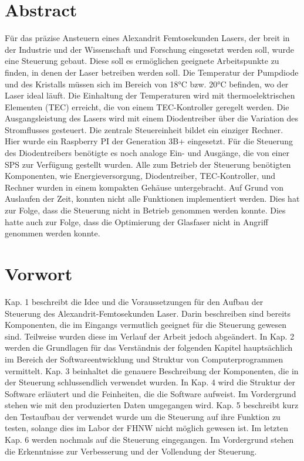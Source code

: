\section*{Abstract}
Für das präzise Ansteuern eines Alexandrit Femtosekunden Lasers, der breit in der Industrie und der Wissenschaft und Forschung eingesetzt werden soll, wurde eine Steuerung gebaut. Diese soll es ermöglichen geeignete Arbeitspunkte zu finden, in denen der Laser betreiben werden soll. Die Temperatur der Pumpdiode und des Kristalls müssen sich im Bereich von 18°C bzw. 20°C befinden, wo der Laser ideal läuft. Die Einhaltung der Temperaturen wird mit thermoelektrischen Elementen (TEC) erreicht, die von einem TEC-Kontroller geregelt werden. Die Ausgangsleistung des Lasers wird mit einem Diodentreiber über die Variation des Stromflusses gesteuert. Die zentrale Steuereinheit bildet ein einziger Rechner. Hier wurde ein Raspberry PI der Generation 3B+ eingesetzt. Für die Steuerung des Diodentreibers benötigte es noch analoge Ein- und Ausgänge, die von einer SPS zur Verfügung gestellt wurden. Alle zum Betrieb der Steuerung benötigten Komponenten, wie Energieversorgung, Diodentreiber, TEC-Kontroller, und Rechner wurden in einem kompakten Gehäuse untergebracht. Auf Grund von Auslaufen der Zeit, konnten nicht alle Funktionen implementiert werden. Dies hat zur Folge, dass die Steuerung nicht in Betrieb genommen werden konnte. Dies hatte auch zur Folge, dass die Optimierung der Glasfaser nicht in Angriff genommen werden konnte.


\clearpage
\section*{Vorwort}
Kap. 1 beschreibt die Idee und die Voraussetzungen für den Aufbau der Steuerung des Alexandrit-Femtosekunden Laser. Darin beschreiben sind bereits Komponenten, die im Eingangs vermutlich geeignet für die Steuerung gewesen sind. Teilweise wurden diese im Verlauf der Arbeit jedoch abgeändert. In Kap. 2 werden die Grundlagen für das Verständnis der folgenden Kapitel hauptsächlich im Bereich der Softwareentwicklung und Struktur von Computerprogrammen vermittelt. Kap. 3 beinhaltet die genauere Beschreibung der Komponenten, die in der Steuerung schlussendlich verwendet wurden. In Kap. 4 wird die Struktur der Software erläutert und die Feinheiten, die die Software aufweist. Im Vordergrund stehen wie mit den produzierten Daten umgegangen wird. Kap. 5 beschreibt kurz den Testaufbau der verwendet wurde um die Steuerung auf ihre Funktion zu testen, solange dies im Labor der FHNW nicht möglich gewesen ist. Im letzten Kap. 6 werden nochmals auf die Steuerung eingegangen. Im Vordergrund stehen die Erkenntnisse zur Verbesserung und der Vollendung der Steuerung.

